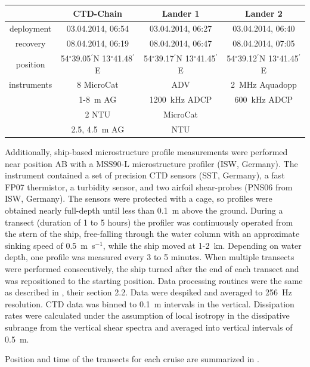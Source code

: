 \begin{table}
\begin{center}
\begin{tabular}{cccc}
& CTD-Chain & Lander 1 & Lander 2 \\
\hline
 deployment & 03.04.2014, 06:54 & 03.04.2014, 06:27 & 03.04.2014, 06:40 \\ 
 recovery & 08.04.2014, 06:19 & 08.04.2014, 06:47 & 08.04.2014, 07:05 \\
\hline
position & 54$^\circ$39.05$^\prime$N 13$^\circ$41.48$^\prime$E & 
54$^\circ$39.17$^\prime$N 13$^\circ$41.45$^\prime$E & 54$^\circ$39.12$^\prime$N 
13$^\circ$41.45$^\prime$E \\
\hline
instruments & 8 MicroCat & ADV & 2~MHz Aquadopp \\
 & 1-8~m AG & 1200~kHz ADCP & 600~kHz ADCP\\
 & 2 NTU & MicroCat & \\
 & 2.5, 4.5~m AG & NTU & \\
 \end{tabular}
\end{center}
\end{table}

Additionally, ship-based microstructure profile measurements were performed 
near position AB with a MSS90-L microstructure profiler (ISW, Germany). The 
instrument contained a set of 
precision CTD sensors (SST, Germany), a fast FP07 thermistor, a turbidity 
sensor, and two airfoil shear-probes (PNS06 from ISW, Germany). The 
sensors were protected with a cage, so profiles were obtained nearly full-depth 
until less than 0.1~m above the ground. During a transect (duration of 1 to 5 
hours) the profiler was continuously operated from the stern of the ship, 
free-falling through the water column with an approximate sinking speed of 
0.5~m~s$^{-1}$, while the ship moved at 1-2~kn. Depending on water depth, one 
profile was measured every 3 to 5 minutes. When multiple transects 
were performed consecutively, the ship turned after the end of each transect 
and was repositioned to the starting position. 
Data processing routines were the same as described in \cite{vanderlee2011}, 
their section 2.2. Data were despiked and averaged to 256~Hz resolution. 
CTD data was binned to 0.1~m intervals in the vertical. Dissipation rates were 
calculated under the assumption of local isotropy in the dissipative subrange 
from the vertical shear spectra and averaged into vertical intervals of 0.5~m.

Position and time of the transects for each cruise are summarized in 
.

